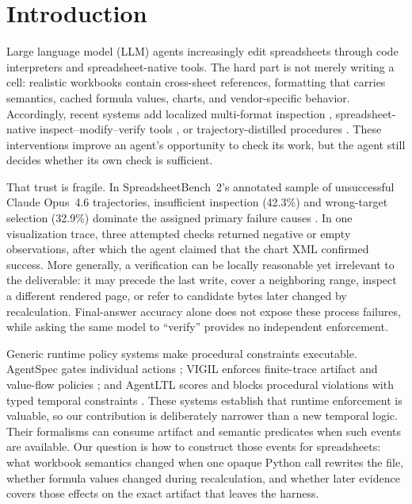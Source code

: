 \section{Introduction}

Large language model (LLM) agents increasingly edit spreadsheets through code
interpreters and spreadsheet-native tools. The hard part is not merely writing
a cell: realistic workbooks contain cross-sheet references, formatting that
carries semantics, cached formula values, charts, and vendor-specific behavior.
Accordingly, recent systems add localized multi-format inspection
\citep{ren2026spreadsheetagent}, spreadsheet-native inspect--modify--verify
tools \citep{chi2026spreadsheetrl}, or trajectory-distilled procedures
\citep{ni2026trace2skill}. These interventions improve an agent's opportunity
to check its work, but the agent still decides whether its own check is
sufficient.

That trust is fragile. In SpreadsheetBench~2's annotated sample of unsuccessful
Claude Opus~4.6 trajectories, insufficient inspection (42.3\%) and wrong-target
selection (32.9\%) dominate the assigned primary failure causes
\citep{zhu2026spreadsheetbench2}. In one visualization trace, three attempted
checks returned negative or empty observations, after which the agent claimed
that the chart XML confirmed success. More generally, a verification can be
locally reasonable yet irrelevant to the deliverable: it may precede the last
write, cover a neighboring range, inspect a different rendered page, or refer
to candidate bytes later changed by recalculation. Final-answer accuracy alone
does not expose these process failures, while asking the same model to
``verify'' provides no independent enforcement.

Generic runtime policy systems make procedural constraints executable.
AgentSpec gates individual actions \citep{wang2026agentspec}; VIGIL enforces
finite-trace artifact and value-flow policies \citep{li2026vigil}; and AgentLTL
scores and blocks procedural violations with typed temporal constraints
\citep{elkoussy2026agentltl}. These systems establish that runtime enforcement
is valuable, so our contribution is deliberately narrower than a new temporal
logic. Their formalisms can consume artifact and semantic predicates when such
events are available. Our question is how to construct those events for
spreadsheets: what workbook semantics changed when one opaque Python call
rewrites the file, whether formula values changed during recalculation, and
whether later evidence covers those effects on the exact artifact that leaves
the harness.

